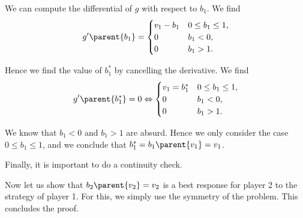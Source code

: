 We can compute the differential of $g$ with respect to $b_1$. We find
\begin{equation*}
    g' \parent{b_1}
    =
    \begin{cases}
       v_1 - b_1  & 0 \leq b_1 \leq 1, \\
       0 & b_1 < 0, \\
       0 & b_1 > 1. \\ 
     \end{cases}
\end{equation*}

Hence we find the value of $b_1^{*}$ by cancelling the derivative. We find
\begin{equation*}
    g' \parent{b_1^{*}} = 0
    \Leftrightarrow 
    \begin{cases}
       v_1 = b_1^{*}  & 0 \leq b_1 \leq 1, \\
       0 & b_1 < 0, \\
       0 & b_1 > 1. \\
     \end{cases}
\end{equation*}

We know that $b_1 < 0$ and $b_1 > 1$ are absurd. Hence we only consider the case $0 \leq b_1 \leq 1$, and we conclude that $b_1^{*} = b_1 \parent{v_1} = v_1$. 

Finally, it is important to do a continuity check. 


\vspace{5mm}

Now let us show that $b_2 \parent{v_2} = v_2$ is a best response for player 2 to the strategy of player 1. For this, we simply use the symmetry of the problem. This concludes the proof.